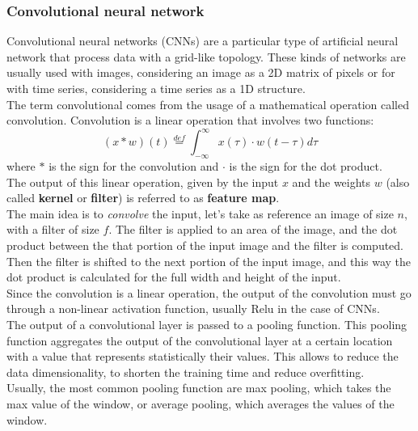 \subsubsection{Convolutional neural network}
Convolutional neural networks (\glspl{CNN}) are a particular type of artificial neural network that process data with a grid-like topology. These kinds of networks are usually used with images, considering an image as a 2D matrix of pixels or for with time series, considering a time series as a 1D structure. \\

The term convolutional comes from the usage of a mathematical operation called convolution. Convolution is a linear operation that involves two functions:
\begin{equation}
    (x \ast w)(t) \overset{def}{=} \int_{-\infty}^{\infty} x(\tau) \cdot w(t-\tau) d\tau
\end{equation}
\noindent where $\ast$ is the sign for the convolution and $\cdot$ is the sign for the dot product.\\
The output of this linear operation, given by the input $x$ and the weights $w$ (also called \textbf{kernel} or \textbf{filter}) is referred to as \textbf{feature map}. \\


The main idea is to \emph{convolve} the input, let's take as reference an image of size $n$, with a filter of size $f$. The filter is applied to an area of the image, and the dot product between the that portion of the input image and the filter is computed. Then the filter is shifted to the next portion of the input image, and this way the dot product is calculated for the full width and height of the input.\\
Since the convolution is a linear operation, the output of the convolution must go through a non-linear activation function, usually \gls{Relu} in the case of \glspl{CNN}. \\

The output of a convolutional layer is passed to a pooling function. This pooling function aggregates the output of the convolutional layer at a certain location with a value that represents statistically their values. This allows to reduce the data dimensionality, to shorten the training time and reduce overfitting.\\
Usually, the most common pooling function are max pooling, which takes the max value of the window, or average pooling, which averages the values of the window. \\

